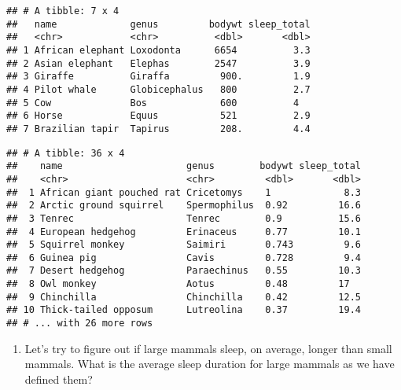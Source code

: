 \documentclass[]{article}
\newenvironment{Shaded}{\begin{snugshade}}{\end{snugshade}}
\newcommand{\KeywordTok}[1]{\textcolor[rgb]{0.13,0.29,0.53}{\textbf{#1}}}
\newcommand{\DecValTok}[1]{\textcolor[rgb]{0.00,0.00,0.81}{#1}}
\newcommand{\StringTok}[1]{\textcolor[rgb]{0.31,0.60,0.02}{#1}}
\newcommand{\OperatorTok}[1]{\textcolor[rgb]{0.81,0.36,0.00}{\textbf{#1}}}
\newcommand{\NormalTok}[1]{#1}
\providecommand{\tightlist}{%
  \setlength{\itemsep}{0pt}\setlength{\parskip}{0pt}}
\begin{document}
\begin{verbatim}
## # A tibble: 7 x 4
##   name             genus         bodywt sleep_total
##   <chr>            <chr>          <dbl>       <dbl>
## 1 African elephant Loxodonta      6654          3.3
## 2 Asian elephant   Elephas        2547          3.9
## 3 Giraffe          Giraffa         900.         1.9
## 4 Pilot whale      Globicephalus   800          2.7
## 5 Cow              Bos             600          4  
## 6 Horse            Equus           521          2.9
## 7 Brazilian tapir  Tapirus         208.         4.4
\end{verbatim}

\begin{Shaded}
\end{Shaded}

\begin{verbatim}
## # A tibble: 36 x 4
##    name                      genus        bodywt sleep_total
##    <chr>                     <chr>         <dbl>       <dbl>
##  1 African giant pouched rat Cricetomys    1             8.3
##  2 Arctic ground squirrel    Spermophilus  0.92         16.6
##  3 Tenrec                    Tenrec        0.9          15.6
##  4 European hedgehog         Erinaceus     0.77         10.1
##  5 Squirrel monkey           Saimiri       0.743         9.6
##  6 Guinea pig                Cavis         0.728         9.4
##  7 Desert hedgehog           Paraechinus   0.55         10.3
##  8 Owl monkey                Aotus         0.48         17  
##  9 Chinchilla                Chinchilla    0.42         12.5
## 10 Thick-tailed opposum      Lutreolina    0.37         19.4
## # ... with 26 more rows
\end{verbatim}

\begin{enumerate}
\def\labelenumi{\arabic{enumi}.}
\setcounter{enumi}{4}
\tightlist
\item
  Let's try to figure out if large mammals sleep, on average, longer
  than small mammals. What is the average sleep duration for large
  mammals as we have defined them?
\end{enumerate}
\end{document}
